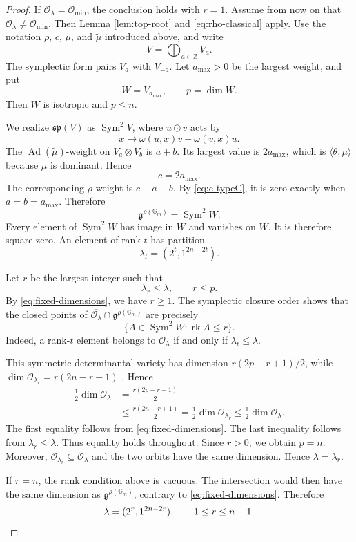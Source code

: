 \documentclass[10pt,a4paper]{amsart}
\DeclareMathOperator{\rk}{rk}
\DeclareMathOperator{\Sym}{Sym}
\newcommand{\Gm}{\mathbb G_m}
\begin{document}
\begin{proof}
If $\mathcal O_\lambda=\mathcal O_{\min}$, the conclusion holds with
$r=1$. Assume from now on that
$\mathcal O_\lambda\ne\mathcal O_{\min}$. Then
Lemma \ref{lem:top-root} and \eqref{eq:rho-classical} apply. Use the
notation $\rho$, $c$, $\mu$, and $\widetilde{\mu}$ introduced above,
and write
\[
V=\bigoplus_{a\in\mathbb Z}V_a.
\]
The symplectic form pairs $V_a$ with $V_{-a}$. Let $a_{\max}>0$ be
the largest weight, and put
\[
W=V_{a_{\max}},\qquad p=\dim W.
\]
Then $W$ is isotropic and $p\leq n$.

We realize $\mathfrak{sp}(V)$ as $\Sym^2V$, where $u\odot v$ acts by
\[
x\longmapsto \omega(u,x)v+\omega(v,x)u.
\]
The $\operatorname{Ad}(\widetilde{\mu})$-weight on
$V_a\otimes V_b$ is $a+b$. Its largest value is $2a_{\max}$, which is
$\langle\theta,\mu\rangle$ because $\mu$ is dominant. Hence
\begin{equation}\label{eq:c-typeC}
c=2a_{\max}.
\end{equation}
The corresponding $\rho$-weight is $c-a-b$. By
\eqref{eq:c-typeC}, it is zero exactly when
$a=b=a_{\max}$. Therefore
\[
\mathfrak g^{\rho(\Gm)}=\Sym^2W.
\]
Every element of $\Sym^2W$ has image in $W$ and vanishes on $W$.
It is therefore square-zero. An element of rank $t$ has partition
\[
\lambda_t=(2^t,1^{2n-2t}).
\]

Let $r$ be the largest integer such that
\[
\lambda_r\leq\lambda,\qquad r\leq p.
\]
By \eqref{eq:fixed-dimensions}, we have $r\geq1$. The symplectic
closure order \cite{KP} shows that the closed points of
$\overline{\mathcal O_\lambda}\cap\mathfrak g^{\rho(\Gm)}$ are
precisely
\[
\{A\in\Sym^2W:\rk A\leq r\}.
\]
Indeed, a rank-$t$ element belongs to
$\overline{\mathcal O_\lambda}$ if and only if
$\lambda_t\leq\lambda$.

This symmetric determinantal variety has dimension
$r(2p-r+1)/2$, while
$\dim\mathcal O_{\lambda_r}=r(2n-r+1)$ \cite{KP}. Hence
\[
\begin{aligned}
\frac12\dim\mathcal O_\lambda
&=\frac{r(2p-r+1)}2\\
&\leq\frac{r(2n-r+1)}2
=\frac12\dim\mathcal O_{\lambda_r}
\leq\frac12\dim\mathcal O_\lambda.
\end{aligned}
\]
The first equality follows from \eqref{eq:fixed-dimensions}. The last
inequality follows from $\lambda_r\leq\lambda$. Thus equality holds
throughout. Since $r>0$, we obtain $p=n$. Moreover,
$\mathcal O_{\lambda_r}\subseteq\overline{\mathcal O_\lambda}$ and
the two orbits have the same dimension. Hence
$\lambda=\lambda_r$.

If $r=n$, the rank condition above is vacuous. The intersection would
then have the same dimension as $\mathfrak g^{\rho(\Gm)}$, contrary
to \eqref{eq:fixed-dimensions}. Therefore
\[
\lambda=(2^r,1^{2n-2r}),\qquad 1\leq r\leq n-1.\qedhere
\]
\end{proof}
\end{document}
